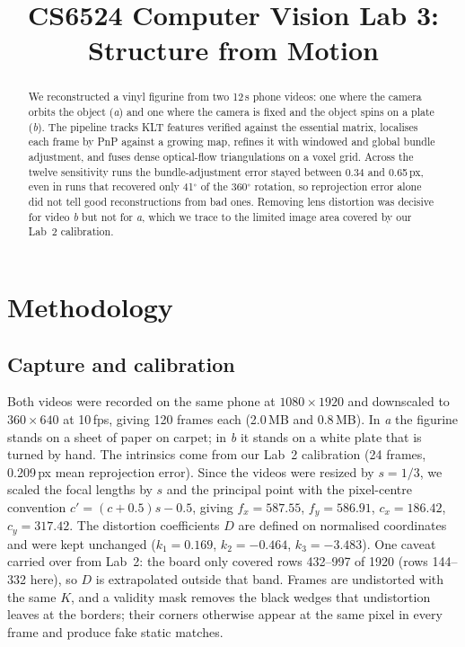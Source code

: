 \documentclass[conference]{assets/latex/IEEEtran}
\begin{document}
\title{CS6524 Computer Vision Lab 3:\\ Structure from Motion}

\author{
\and
{}
}

\maketitle

\begin{abstract}
We reconstructed a vinyl figurine from two 12\,s phone videos: one where the camera orbits the
object (\textit{a}) and one where the camera is fixed and the object spins on a plate (\textit{b}).
The pipeline tracks KLT features verified against the essential matrix, localises each frame by PnP
against a growing map, refines it with windowed and global bundle adjustment, and fuses dense
optical-flow triangulations on a voxel grid. Across the twelve sensitivity runs the bundle-adjustment
error stayed between 0.34 and 0.65\,px, even in runs that recovered only 41$^\circ$ of the
360$^\circ$ rotation, so reprojection error alone did not tell good reconstructions from bad ones.
Removing lens distortion was decisive for video \textit{b} but not for \textit{a}, which we trace
to the limited image area covered by our Lab~2 calibration.
\end{abstract}

\section{Methodology}

\subsection{Capture and calibration}
Both videos were recorded on the same phone at $1080\times1920$ and downscaled to $360\times640$ at
10\,fps, giving 120 frames each (2.0\,MB and 0.8\,MB). In \textit{a} the figurine stands on a
sheet of paper on carpet; in \textit{b} it stands on a white plate that is turned by hand.
The intrinsics come from our Lab~2 calibration (24 frames, 0.209\,px mean reprojection error).
Since the videos were resized by $s=1/3$, we scaled the focal lengths by $s$ and the principal point
with the pixel-centre convention $c' = (c+0.5)s-0.5$, giving $f_x=587.55$, $f_y=586.91$,
$c_x=186.42$, $c_y=317.42$. The distortion coefficients $D$ are defined on normalised coordinates
and were kept unchanged ($k_1=0.169$, $k_2=-0.464$, $k_3=-3.483$). One caveat carried over from
Lab~2: the board only covered rows 432--997 of 1920 (rows 144--332 here), so $D$ is extrapolated
outside that band. Frames are undistorted with the same $K$, and a validity mask removes the black
wedges that undistortion leaves at the borders; their corners otherwise appear at the same pixel in
every frame and produce fake static matches.
\end{document}
